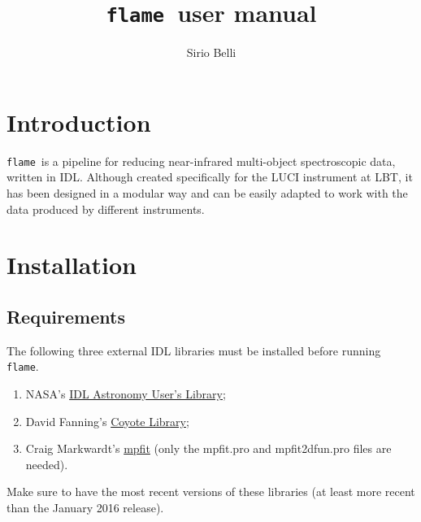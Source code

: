 \documentclass[a4paper, notitlepage]{article}
\newcommand{\flame}{\texttt{flame}}
\begin{document}
\lstset{language=IDL}

\title{\flame\ user manual}
\author{Sirio Belli}
\maketitle





\section{Introduction}

\flame\ is a pipeline for reducing near-infrared multi-object spectroscopic data, written in IDL. Although created specifically for the LUCI instrument at LBT, it has been designed in a modular way and can be easily adapted to work with the data produced by different instruments.








\section{Installation}

\subsection{Requirements}

The following three external IDL libraries must be installed before running \flame.
\begin{enumerate}
\item NASA's \href{http://idlastro.gsfc.nasa.gov/}{IDL Astronomy User's Library};
\item David Fanning's \href{http://www.idlcoyote.com/code_tips/installcoyote.php}{Coyote Library};
\item Craig Markwardt's \href{https://www.physics.wisc.edu/~craigm/idl/fitting.html}{mpfit} (only the mpfit.pro and mpfit2dfun.pro files are needed).
\end{enumerate}
Make sure to have the most recent versions of these libraries (at least more recent than the January 2016 release).
\end{document}

